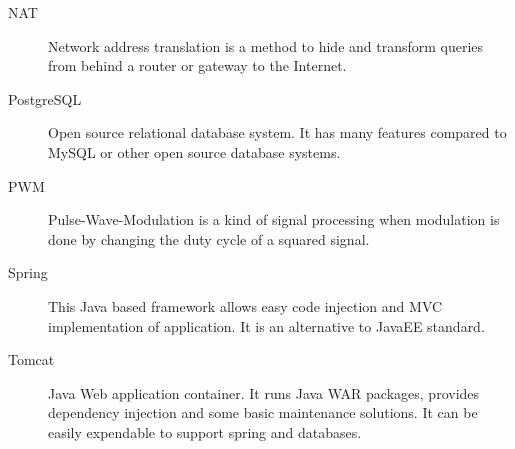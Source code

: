 \begin{description}
	\item[NAT] Network address translation is a method to hide and transform queries from behind a router or gateway to the Internet.
	
	\item[PostgreSQL] Open source relational database system. It has many features compared to MySQL or other open source database systems.
	
	\item[PWM] Pulse-Wave-Modulation is a kind of signal processing when modulation is done by changing the duty cycle of a squared signal.
	
	\item[Spring] This Java based framework allows easy code injection and MVC implementation of application. It is an alternative to JavaEE standard.

	\item[Tomcat]  Java Web application container. It runs Java WAR packages, provides dependency injection and some basic maintenance solutions. It can be easily expendable to support spring and databases.
\end{description}
